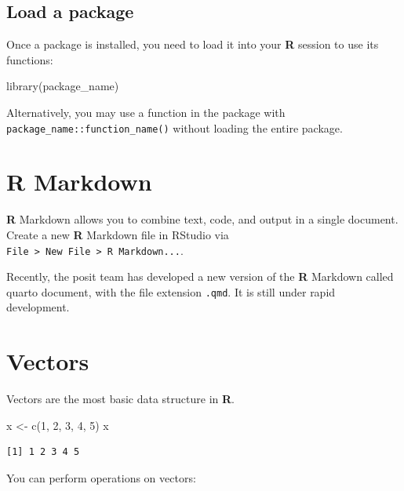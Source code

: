 \documentclass[
  letterpaper,
  DIV=11,
  numbers=noendperiod]{scrreprt}
\newenvironment{Shaded}{\begin{snugshade}}{\end{snugshade}}
\newcommand{\DecValTok}[1]{\textcolor[rgb]{0.68,0.00,0.00}{#1}}
\newcommand{\FunctionTok}[1]{\textcolor[rgb]{0.28,0.35,0.67}{#1}}
\newcommand{\NormalTok}[1]{\textcolor[rgb]{0.00,0.23,0.31}{#1}}
\newcommand{\OtherTok}[1]{\textcolor[rgb]{0.00,0.23,0.31}{#1}}
\begin{document}
\subsection{Load a package}\label{load-a-package}

Once a package is installed, you need to load it into your \textbf{R}
session to use its functions:

\begin{Shaded}
\begin{Highlighting}[]
\FunctionTok{library}\NormalTok{(package\_name)}
\end{Highlighting}
\end{Shaded}

Alternatively, you may use a function in the package with
\texttt{package\_name::function\_name()} without loading the entire
package.

\section{R Markdown}\label{r-markdown}

\textbf{R} Markdown allows you to combine text, code, and output in a
single document. Create a new \textbf{R} Markdown file in RStudio via
\texttt{File\ \textgreater{}\ New\ File\ \textgreater{}\ R\ Markdown...}.

Recently, the posit team has developed a new version of the \textbf{R}
Markdown called quarto document, with the file extension \texttt{.qmd}.
It is still under rapid development.

\section{Vectors}\label{vectors}

Vectors are the most basic data structure in \textbf{R}.

\begin{Shaded}
\begin{Highlighting}[]
\NormalTok{x }\OtherTok{\textless{}{-}} \FunctionTok{c}\NormalTok{(}\DecValTok{1}\NormalTok{, }\DecValTok{2}\NormalTok{, }\DecValTok{3}\NormalTok{, }\DecValTok{4}\NormalTok{, }\DecValTok{5}\NormalTok{)}
\NormalTok{x}
\end{Highlighting}
\end{Shaded}

\begin{verbatim}
[1] 1 2 3 4 5
\end{verbatim}

You can perform operations on vectors:
\end{document}
